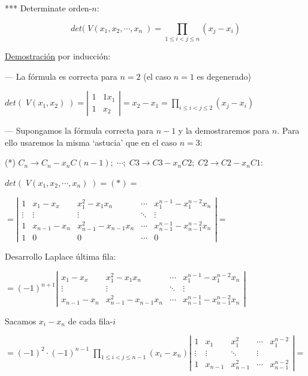 *** Determinate orden-$n$:

\begin{equation*}
	det(\;V(x_1,x_2,\cdots ,x_n \;)= \prod_{1 \le i < j \le n}(x_j-x_i)
\end{equation*}

\underline{Demostración} por inducción:

--- La fórmula es correcta para $n=2$ (el caso $n=1$ es degenerado)

$det(\; V(x_1,x_2)\; )=\left| \begin{matrix} 1&1x_1 \\ 1&x_2 \end{matrix} \right|=x_2-x_1 = \prod_{i \le i < j \le 2} (x_j-x_i)$

--- Supongamos la fórmula correcta para $n-1$ y la demostraremos para $n$. Para ello usaremos la misma `astucia' que en el caso $n=3$:

\noindent (*) $C_n\to C_n-x_n C(n-1); \; \cdots ; \; C3\to C3-x_nC2; \; C2\to C2-x_n C1$:

\noindent $det(\; V(x_1,x_2, \cdots, x_n)\; )=(*)=$

\noindent $=\left| \begin{matrix}
 	1&x_1-x_x&x_1^2-x_1x_n& \cdots &x_1^{n-1}-x_1^{n-2}x_n\\
 	\vdots &\vdots & \vdots & \ddots & \vdots \\
 	1&x_{n-1}-x_n&x_{n-1}^2-x_{n-1}x_n &\cdots & x_{n-1}^{n-1}-x_{n-1}^{n-2}x_n\\ 1&0&0&\cdots &0
 \end{matrix} \right| =$

\noindent Desarrollo Laplace última fila:

\noindent $=(-1)^{n+1}
\left| \begin{matrix}
 	x_1-x_x&x_1^2-x_1x_n& \cdots &x_1^{n-1}-x_1^{n-2}x_n\\
 	\vdots & \vdots & \ddots & \vdots \\
 	x_{n-1}-x_n&x_{n-1}^2-x_{n-1}x_n &\cdots & x_{n-1}^{n-1}-x_{n-1}^{n-2}x_n
 \end{matrix} \right|$
 
 \noindent Sacamos $x_i-x_n$ de cada fila-$i$
 
 \noindent $\displaystyle =(-1)^2\cdot (-1)^{n-1}\; \prod_{1\le i < j \le n-1} (x_i-x_n)
 \left| \begin{matrix}
 1 & x_1 & x_1^2 & \cdots & x_1^{n-2}\\
 \vdots & \vdots & \ddots & \vdots \\
 1& x_{n-1} & x_{n-1}^2 & \cdots & x_{n-1}^{n-2}	
 \end{matrix} \right|=$
 
